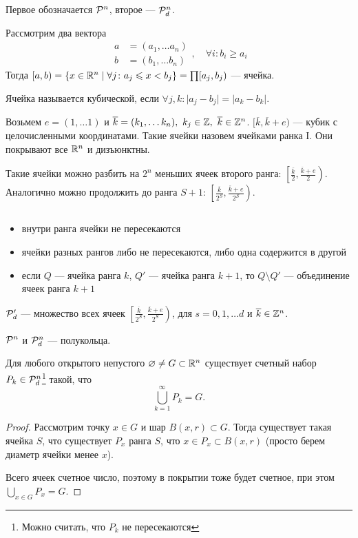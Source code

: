 \begin{ex}
	Первое обозначается $ \P^{n}$,  второе --- $ \P^{n}_{d}$.

	Рассмотрим два вектора
	\[
	\begin{aligned}
		a& = (a_1, \ldots a_{n}) \\
		b& = (b_1, \ldots b_n)
	\end{aligned}
	, \quad \forall i\colon b_i \ge a_i
	\]
	Тогда $ [a, b) = \{x \in \R^{n} \mid \forall j \colon a_j \le x < b_j\} = \prod [a_j, b_j)$ --- {\sf ячейка}.

	Ячейка называется {\sf кубической}, если $ \forall j, k \colon  \lvert a_j - b_j \rvert  = \lvert a_k - b_k \rvert $.

	Возьмем $ e = (1, \ldots 1)$ и $ \overline{k} = (k_1, \ldots k_n), ~ k_j \in \Z, ~ \overline{k} \in \Z^{n}$.
	$ [\overline{k}, \overline{k}+e)$ --- кубик с целочисленными координатами. Такие ячейки назовем {\sf ячейками ранка I}. Они покрывают все $ \R^{n} $ и дизъюнктны.  

	Такие ячейки можно разбить на $ 2^{n}$ меньших ячеек второго ранга: $ \left[ \frac{\overline{k}}{2}, \frac{\overline{k}+e}{2}\right)$. Аналогично можно продолжить до ранга $ S+1$:  $ \left[ \frac{\overline{k}}{2^{S}}, \frac{\overline{k}+e}{2^{S}} \right)$.
	\begin{prop}
		$ $
		\begin{itemize}
			\item внутри ранга ячейки не пересекаются
			\item ячейки разных рангов либо не пересекаются, либо одна содержится в другой
			\item если $ Q$ --- ячейка ранга $ k$, $ Q'$ --- ячейка ранга $ k+1$, то $ Q \setminus Q'$ --- объединение ячеек ранга $ k+1$
	    \end{itemize}
	\end{prop}
	$ \P_{d}' $ --- множество всех ячеек $ \left[ \frac{\overline{k}}{2^{S}}, \frac{\overline{k} +e}{2^{S}}\right)$, для $ s = 0, 1, \ldots d$ и $ \overline{k} \in \Z^{n}$.
\end{ex}
\begin{thm}
    $ \P^{n}$ и $ \P_{d}^{n}$ --- полукольца.
\end{thm}
\begin{thm}
	Для любого открытого непустого $ \varnothing \ne G \subset \R^{n} $ существует счетный набор $ P_k \in \P_{d}^{n}$\footnote{Можно считать, что $ P_k$ не пересекаются} такой, что
	\[
	\bigcup_{k=1}^{\infty} P_k = G
	.\] 
\end{thm}
\begin{proof}
	Рассмотрим точку $ x \in G$ и шар $ B(x, r) \subset G$.
	Тогда существует такая ячейка $ S$, что существует  $ P_x$ ранга $ S$, что  $ x \in P_x \subset B(x, r)$ (просто берем диаметр ячейки менее $ x$).

	Всего ячеек счетное число, поэтому в покрытии тоже будет счетное, при этом $ \bigcup_{x \in G} P_x = G$.
\end{proof}

